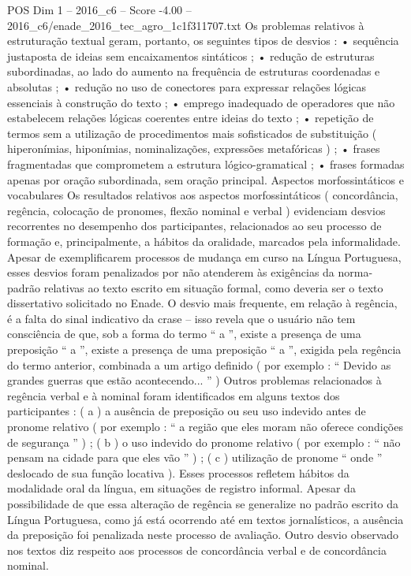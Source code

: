 \begin{textsample}{POS Dim 1 – 2016\_c6 – Score -4.00 – 2016\_c6/enade\_2016\_tec\_agro\_1c1f311707.txt}
Os problemas relativos à estruturação textual geram, portanto, os seguintes tipos de desvios : • sequência justaposta de ideias sem encaixamentos sintáticos ; • redução de estruturas subordinadas, ao lado do aumento na frequência de estruturas coordenadas e absolutas ; • redução no uso de conectores para expressar relações lógicas essenciais à construção do texto ; • emprego inadequado de operadores que não estabelecem relações lógicas coerentes entre ideias do texto ; • repetição de termos sem a utilização de procedimentos mais sofisticados de substituição ( hiperonímias, hiponímias, nominalizações, expressões metafóricas ) ; • frases fragmentadas que comprometem a estrutura lógico-gramatical ; • frases formadas apenas por oração subordinada, sem oração principal.
Aspectos morfossintáticos e vocabulares Os resultados relativos aos aspectos morfossintáticos ( concordância, regência, colocação de pronomes, flexão nominal e verbal ) evidenciam desvios recorrentes no desempenho dos participantes, relacionados ao seu processo de formação e, principalmente, a hábitos da oralidade, marcados pela informalidade.
Apesar de exemplificarem processos de mudança em curso na Língua Portuguesa, esses desvios foram penalizados por não atenderem às exigências da norma-padrão relativas ao texto escrito em situação formal, como deveria ser o texto dissertativo solicitado no Enade.
O desvio mais frequente, em relação à regência, é a falta do sinal indicativo da crase – isso revela que o usuário não tem consciência de que, sob a forma do termo “ a ”, existe a presença de uma preposição “ a ”, existe a presença de uma preposição “ a ”, exigida pela regência do termo anterior, combinada a um artigo definido ( por exemplo : “ Devido as grandes guerras que estão acontecendo... ” ) Outros problemas relacionados à regência verbal e à nominal foram identificados em alguns textos dos participantes : ( a ) a ausência de preposição ou seu uso indevido antes de pronome relativo ( por exemplo : “ a região que eles moram não oferece condições de segurança ” ) ; ( b ) o uso indevido do pronome relativo ( por exemplo : “ não pensam na cidade para que eles vão ” ) ; ( c ) utilização de pronome “ onde ” deslocado de sua função locativa ).
Esses processos refletem hábitos da modalidade oral da língua, em situações de registro informal.
Apesar da possibilidade de que essa alteração de regência se generalize no padrão escrito da Língua Portuguesa, como já está ocorrendo até em textos jornalísticos, a ausência da preposição foi penalizada neste processo de avaliação.
Outro desvio observado nos textos diz respeito aos processos de concordância verbal e de concordância nominal.

\end{textsample}
